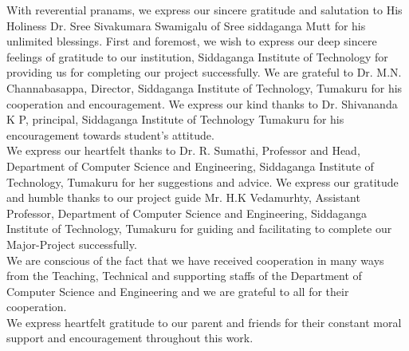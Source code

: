 \begin{acknowledgements}      
\normalsize{
With reverential pranams, we express our sincere gratitude and salutation
to His Holiness Dr. Sree Sivakumara Swamigalu of Sree siddaganga
Mutt for his unlimited blessings. First and foremost, we wish to express
our deep sincere feelings of gratitude to our institution, Siddaganga Institute
of Technology for providing us for completing our project successfully.
We are grateful to Dr. M.N. Channabasappa, Director, Siddaganga Institute
of Technology, Tumakuru for his cooperation and encouragement.
We express our kind thanks to Dr. Shivananda K P, principal, Siddaganga
Institute of Technology Tumakuru for his encouragement towards
student’s attitude.\\
We express our heartfelt thanks to Dr. R. Sumathi, Professor and Head,
Department of Computer Science and Engineering, Siddaganga Institute
of Technology, Tumakuru for her suggestions and advice. We express
our gratitude and humble thanks to our project guide Mr. H.K Vedamurhty,
Assistant Professor, Department of Computer Science and Engineering,
Siddaganga Institute of Technology, Tumakuru for guiding and facilitating
to complete our Major-Project successfully.\\
We are conscious of the fact that we have received cooperation in many
ways from the Teaching, Technical and supporting staffs of the Department
of Computer Science and Engineering and we are grateful to all for
their cooperation.\\
We express heartfelt gratitude to our parent and friends for their constant
moral support and encouragement throughout this work.
}
\vspace{1.5cm}

\end{acknowledgements}


